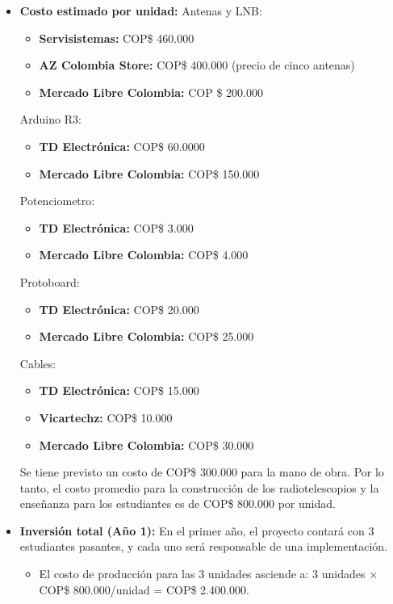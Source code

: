 \begin{itemize}
  \item \textbf{Costo estimado por unidad:}
    Antenas y LNB:
    \begin{itemize}
      \item \textbf{Servisistemas:} COP\$ 460.000
      \item \textbf{AZ Colombia Store:} COP\$ 400.000 (precio de cinco antenas)
      \item \textbf{{Mercado Libre Colombia:}} COP \$ 200.000
    \end{itemize}
    Arduino R3:
    \begin{itemize}
      \item \textbf{TD Electrónica:} COP\$ 60.0000
      \item \textbf{Mercado Libre Colombia:} COP\$ 150.000
    \end{itemize}
    Potenciometro:
    \begin{itemize}
      \item \textbf{TD Electrónica:} COP\$ 3.000
      \item \textbf{Mercado Libre Colombia:} COP\$ 4.000
    \end{itemize}
    Protoboard:
    \begin{itemize}
      \item \textbf{TD Electrónica:} COP\$ 20.000
      \item \textbf{Mercado Libre Colombia:} COP\$ 25.000
    \end{itemize}
    Cables:
    \begin{itemize}
      \item \textbf{TD Electrónica:} COP\$ 15.000
      \item \textbf{Vicartechz:} COP\$ 10.000
      \item \textbf{Mercado Libre Colombia:} COP\$ 30.000
    \end{itemize}

    Se tiene previsto un costo de COP\$ 300.000 para la mano de obra. Por lo
    tanto, el costo promedio para la construcción de los radiotelescopios y la
    enseñanza para los estudiantes es de COP\$ 800.000 por unidad.

  \item \textbf{Inversión total (Año 1):} En el primer año, el proyecto
    contará con 3 estudiantes pasantes, y cada uno será responsable de una
    implementación.
    \begin{itemize}
      \item El costo de producción para las 3 unidades asciende a:
        3 unidades $\times$ COP\$ 800.000/unidad = COP\$ 2.400.000.
    \end{itemize}
\end{itemize}

